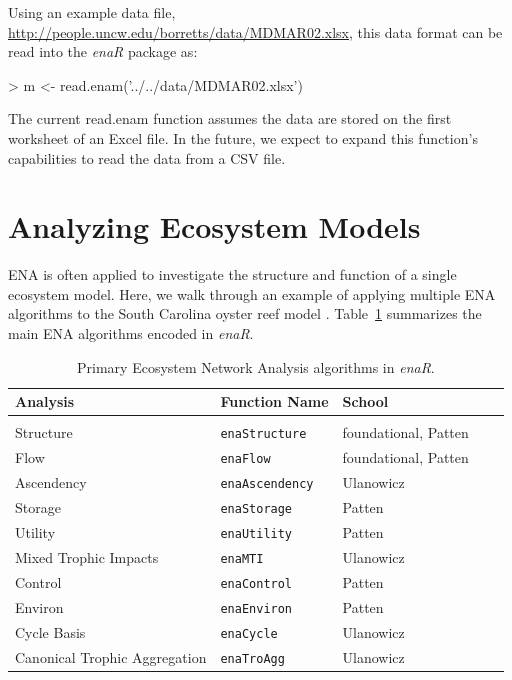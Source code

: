 \documentclass[article]{jss}
\begin{document}
Using an example data file,
\url{http://people.uncw.edu/borretts/data/MDMAR02.xlsx}, this data
format can be read into the \textit{enaR} package as:

\begin{Schunk}
\begin{Sinput}
>   m <- read.enam('../../data/MDMAR02.xlsx')
\end{Sinput}
\end{Schunk}

The current read.enam function assumes the data are stored on the
first worksheet of an Excel file. In the future, we expect to expand
this function's capabilities to read the data from a CSV file.


\section{Analyzing Ecosystem Models}

ENA is often applied to investigate the structure and function of a
single ecosystem model.  Here, we walk through an example of applying
multiple ENA algorithms to the South Carolina oyster reef model
\citep{dame81}.  Table~\ref{tab:alg} summarizes the main ENA
algorithms encoded in \textit{enaR}.


\begin{table}
\center
\caption{Primary Ecosystem Network Analysis algorithms in
  \textit{enaR}.} \label{tab:alg}
\tableline
\begin{tabularx}{\textwidth}{l l l l l }
\textbf{Analysis} & \textbf{Function Name} & \textbf{School} \\ \hline \\ [-1ex]
Structure & \texttt{enaStructure} & foundational, Patten \\
Flow & \texttt{enaFlow} & foundational, Patten \\
Ascendency & \texttt{enaAscendency} & Ulanowicz \\
Storage & \texttt{enaStorage} & Patten \\
Utility & \texttt{enaUtility} & Patten \\
Mixed Trophic Impacts & \texttt{enaMTI} & Ulanowicz \\
Control & \texttt{enaControl} & Patten \\
Environ & \texttt{enaEnviron} & Patten \\
Cycle Basis & \texttt{enaCycle} & Ulanowicz \\
Canonical Trophic Aggregation & \texttt{enaTroAgg} & Ulanowicz \\ \hline
\end{tabularx}
\tableline
\end{table}
\end{document}
